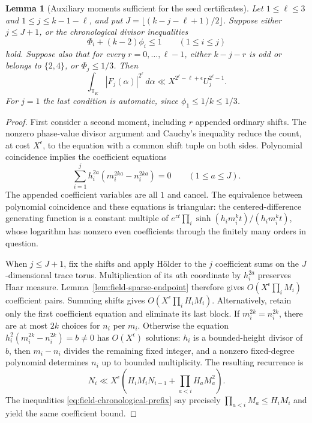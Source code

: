 \documentclass[11pt,reqno]{amsart}
\numberwithin{equation}{section}
\newtheorem{lemma}[theorem]{Lemma}
\theoremstyle{definition}
\begin{document}
\begin{lemma}[Auxiliary moments sufficient for the seed certificates]
\label{lem:field-general-seed-aux}
Let $1\le\ell\le3$ and $1\le j\le k-1-\ell$, and put
$J=\lfloor(k-j-\ell+1)/2\rfloor$.
Suppose either $j\le J+1$, or the chronological divisor inequalities
\begin{equation}\label{eq:field-chronological-prefix}
 \Phi_i+(k-2)\phi_i\le1\qquad(1\le i\le j)
\end{equation}
hold. Suppose also that for every $r=0,\ldots,\ell-1$, either
$k-j-r$ is odd or belongs to $\{2,4\}$, or $\Phi_j\le1/3$.
Then
\[
 \int_{\mathbb T_K}|F_j(\alpha)|^{2^\ell}\,d\alpha
   \ll X^{2^\ell-\ell+\epsilon}U_j^{2^\ell-1}.
\]
For $j=1$ the last condition is automatic, since $\phi_1\le1/k\le1/3$.
\end{lemma}
\begin{proof}
First consider a second moment, including $r$ appended ordinary shifts.
The nonzero phase-value divisor argument and Cauchy's inequality reduce
the count, at cost $X^\epsilon$, to the equation with a common shift tuple
on both sides. Polynomial coincidence implies the coefficient equations
\[
 \sum_{i=1}^j h_i^{2a}(m_i^{2ka}-n_i^{2ka})=0\qquad(1\le a\le J).
\]
The appended coefficient variables are all $1$ and cancel. The equivalence
between polynomial coincidence and these equations is triangular: the
centered-difference generating function is a constant multiple of
$e^{zt}\prod_i\sinh(h_im_i^kt)/(h_im_i^kt)$, whose logarithm has nonzero
even coefficients through the finitely many orders in question.

When $j\le J+1$, fix the shifts and apply H\"older to the $j$ coefficient
sums on the $J$-dimensional trace torus. Multiplication of its $a$th coordinate
by $h_i^{2a}$ preserves Haar measure. Lemma~\ref{lem:field-sparse-endpoint}
therefore gives $O(X^\epsilon\prod_iM_i)$ coefficient pairs. Summing shifts
gives $O(X^\epsilon\prod_iH_iM_i)$.
Alternatively, retain only the first coefficient equation and eliminate its
last block. If $m_i^{2k}=n_i^{2k}$, there are at most $2k$ choices for $n_i$
per $m_i$. Otherwise the equation
$h_i^2(m_i^{2k}-n_i^{2k})=b\ne0$ has $O(X^\epsilon)$ solutions: $h_i$ is a
bounded-height divisor of $b$, then $m_i-n_i$ divides the remaining fixed
integer, and a nonzero fixed-degree polynomial determines $n_i$ up to bounded
multiplicity. The resulting recurrence is
\[
 N_i\ll X^\epsilon\left(H_iM_i N_{i-1}
                      +\prod_{a<i}H_aM_a^2\right).
\]
The inequalities \eqref{eq:field-chronological-prefix} say precisely
$\prod_{a<i}M_a\le H_iM_i$ and yield the same coefficient bound.


\end{proof}
\end{document}
